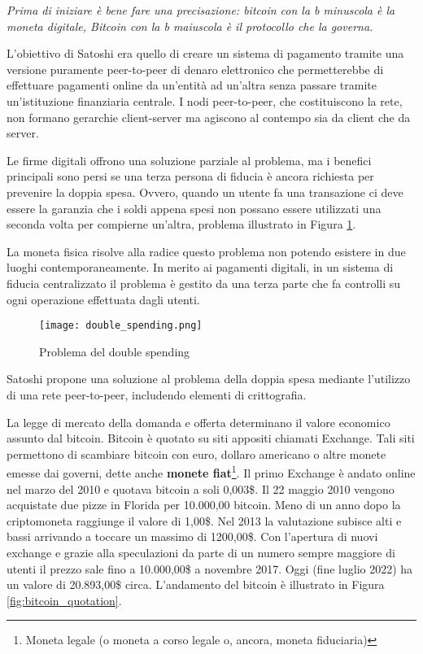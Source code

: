 \textit{Prima di iniziare è bene fare una precisazione: bitcoin con la b minuscola è la moneta digitale, Bitcoin con la b maiuscola è il protocollo che la governa.}

L'obiettivo di Satoshi era quello di creare un sistema di pagamento tramite una versione puramente peer-to-peer di denaro elettronico che permetterebbe di effettuare pagamenti online da un'entità ad un'altra senza passare tramite un'istituzione finanziaria centrale. I nodi peer-to-peer, che costituiscono la rete, non formano gerarchie client-server ma agiscono al contempo sia da client che da server.

Le firme digitali offrono una soluzione parziale al problema, ma i benefici principali sono persi se una terza persona di fiducia è ancora richiesta per prevenire la doppia spesa. Ovvero, quando un utente fa una transazione ci deve essere la garanzia che i soldi appena spesi non possano essere utilizzati una seconda volta per compierne un'altra, problema illustrato in Figura \ref{fig:double_spending}.

La moneta fisica risolve alla radice questo problema non potendo esistere in due luoghi contemporaneamente. In merito ai pagamenti digitali, in un sistema di fiducia centralizzato il problema è gestito da una terza parte che fa controlli su ogni operazione effettuata dagli utenti.

\begin{figure}[htbp]
  \centering
  \texttt{[image: double\_spending.png]}
  \caption{Problema del double spending}
  \label{fig:double_spending}
\end{figure}

Satoshi propone una soluzione al problema della doppia spesa mediante l'utilizzo di una rete peer-to-peer, includendo elementi di crittografia.

La legge di mercato della domanda e offerta determinano il valore economico assunto dal bitcoin. Bitcoin è quotato su siti appositi chiamati Exchange. Tali siti permettono di scambiare bitcoin con euro, dollaro americano o altre monete emesse dai governi, dette anche \textbf{monete fiat}\footnote{Moneta legale (o moneta a corso legale o, ancora, moneta fiduciaria)}. Il primo Exchange è andato online nel marzo del 2010 e quotava bitcoin a soli 0,003\$. Il 22 maggio 2010 vengono acquistate due pizze in Florida per 10.000,00 bitcoin. Meno di un anno dopo la criptomoneta raggiunge il valore di 1,00\$. Nel 2013 la valutazione subisce alti e bassi arrivando a toccare un massimo di 1200,00\$. Con l'apertura di nuovi exchange e grazie alla speculazioni da parte di un numero sempre maggiore di utenti il prezzo sale fino a 10.000,00\$ a novembre 2017. Oggi (fine luglio 2022) ha un valore di 20.893,00\$ circa. L'andamento del bitcoin è illustrato in Figura \ref{fig:bitcoin_quotation}.

